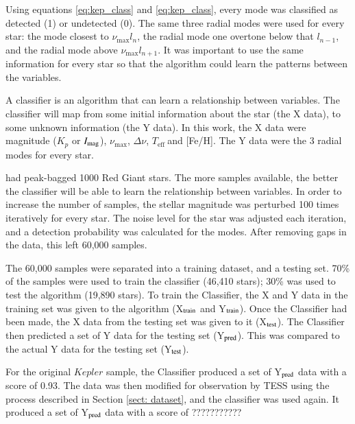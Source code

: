 \documentclass[a4paper,fleqn,usenatbib,useAMS]{mnras}
\newcommand{\numax}{\ensuremath{\nu_{\textrm{max}}}}
\newcommand{\dnu}{\ensuremath{\Delta\nu}}
\newcommand{\teff}{\ensuremath{T_{\textrm{eff}}\:}}
\begin{document}
Using equations \ref{eq:kep_class} and \ref{eq:kep_class}, every mode was classified as detected (1) or undetected (0). The same three radial modes were used for every star: the mode closest to \numax $l_{n}$, the radial mode one overtone below that $l_{n-1}$, and the radial mode above \numax $l_{n+1}$. It was important to use the same information for every star so that the algorithm could learn the patterns between the variables.

A classifier is an algorithm that can learn a relationship between variables. The classifier will map from some initial information about the star (the X data), to some unknown information (the Y data). In this work, the X data were magnitude ($K_{p}$ or $I_{\rm mag}$), \numax, \dnu, \teff and [Fe/H]. The Y data were the 3 radial modes for every star.

\citep{davies_asteroseismology_2016} had peak-bagged 1000 Red Giant stars. The more samples available, the better the classifier will be able to learn the relationship between variables. In order to increase the number of samples, the stellar magnitude was perturbed 100 times iteratively for every star. The noise level for the star was adjusted each iteration, and a detection probability was calculated for the modes. After removing gaps in the data, this left 60,000 samples.

The 60,000 samples were separated into a training dataset, and a testing set. 70\% of the samples were used to train the classifier (46,410 stars); 30\% was used to test the algorithm (19,890 stars). To train the Classifier, the X and Y data in the training set was given to the algorithm (X$_{\rm train}$ and Y$_{\rm train}$). Once the Classifier had been made, the X data from the testing set was given to it (X$_{\rm test}$). The Classifier then predicted a set of Y data for the testing set (Y$_{\rm pred}$). This was compared to the actual Y data for the testing set (Y$_{\rm test}$).

For the original $Kepler$ sample, the Classifier produced a set of Y$_{\rm pred}$ data with a score of 0.93. The data was then modified for observation by TESS using the process described in Section \ref{sect: dataset}, and the classifier was used again. It produced a set of Y$_{\rm pred}$ data with a score of ???????????


\fi















\bsp
\label{lastpage}
\end{document}
